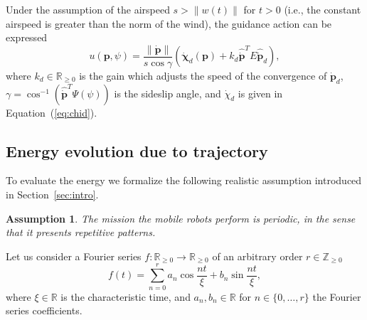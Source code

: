 \documentclass[letterpaper,10pt,conference]{ieeeconf}
\newtheorem{assm}[thm]{Assumption}
\begin{document}
Under the assumption of the airspeed $s>\|w(t)\|$ for $t>0$ (i.e., the constant airspeed is greater than the norm of the wind), the guidance action can be expressed
\begin{equation}\label{eq:uav-cont}
  u(\mathbf{p},\psi)=\frac{\|\dot{\mathbf{p}}\|}{s\cos{\gamma}}\left( \dot{\mathbf{\chi}}_d(\mathbf{p})+k_d\hat{\dot{\mathbf{p}}}^TE\hat{\dot{\mathbf{p}}}_d \right),
\end{equation} 
where $k_d\in\mathbb{R}_{\geq 0}$ is the gain which adjusts the speed of the convergence of $\dot{\mathbf{p}}_d$, $\gamma=\cos^{-1}{\left( \hat{\dot{\mathbf{p}}}^T\Psi(\psi) \right)}$ is the sideslip angle, and $\dot{\chi}_d$ is given in Equation~(\ref{eq:chid}).

\subsection{Energy evolution due to trajectory}
\label{sec:energy-model}

To evaluate the energy we formalize the following realistic assumption introduced in Section~\ref{sec:intro}.
\begin{assm}\label{assm:periodic}
The mission the mobile robots perform is periodic, in the sense that it presents repetitive patterns.
\end{assm}

Let us consider a Fourier series $f:\mathbb{R}_{\geq 0}\rightarrow\mathbb{R}_{\geq 0}$ of an arbitrary order $r\in\mathbb{Z}_{\geq 0}$
\begin{equation}\label{eq:fourier}
  f(t)=\sum_{n=0}^{r}{a_n\cos{\frac{nt}{\xi}}+b_n\sin{\frac{nt}{\xi}}},
\end{equation}
where $\xi\in\mathbb{R}$ is the characteristic time, and $a_n, b_n\in\mathbb{R}$ for $n\in\{0,\dotsc,r\}$ the Fourier series coefficients.
\end{document}
